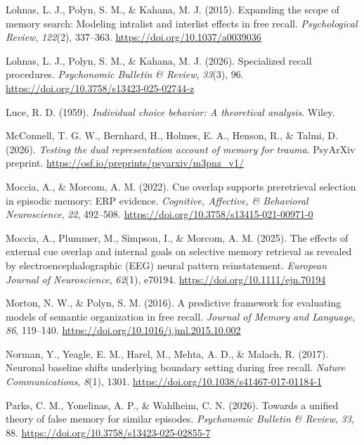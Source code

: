 \documentclass[
  man,
  floatsintext,
  longtable,
  nolmodern,
  notxfonts,
  notimes,
  draftfirst,
  colorlinks=true,linkcolor=blue,citecolor=blue,urlcolor=blue]{apa7}
\newlength{\cslhangindent}
\newenvironment{CSLReferences}[2] %
 {\begin{list}{}{%
  \setlength{\itemindent}{0pt}
  \setlength{\leftmargin}{0pt}
  \setlength{\parsep}{0pt}
  \ifodd #1
   \setlength{\leftmargin}{\cslhangindent}
   \setlength{\itemindent}{-1\cslhangindent}
  \fi
  \setlength{\itemsep}{#2\baselineskip}}}
 {\end{list}}
\begin{document}
\begin{CSLReferences}{1}{0}
Lohnas, L. J., Polyn, S. M., \& Kahana, M. J. (2015). Expanding the
scope of memory search: Modeling intralist and interlist effects in free
recall. \emph{Psychological Review}, \emph{122}(2), 337--363.
\url{https://doi.org/10.1037/a0039036}

Lohnas, L. J., Polyn, S. M., \& Kahana, M. J. (2026). Specialized recall
procedures. \emph{Psychonomic Bulletin \& Review}, \emph{33}(3), 96.
\url{https://doi.org/10.3758/s13423-025-02744-z}

Luce, R. D. (1959). \emph{Individual choice behavior: A theoretical
analysis}. Wiley.

McConnell, T. G. W., Bernhard, H., Holmes, E. A., Henson, R., \& Talmi,
D. (2026). \emph{Testing the dual representation account of memory for
trauma}. PsyArXiv preprint.
\url{https://osf.io/preprints/psyarxiv/m3pnz_v1/}

Moccia, A., \& Morcom, A. M. (2022). Cue overlap supports preretrieval
selection in episodic memory: {ERP} evidence. \emph{Cognitive,
Affective, \& Behavioral Neuroscience}, \emph{22}, 492--508.
\url{https://doi.org/10.3758/s13415-021-00971-0}

Moccia, A., Plummer, M., Simpson, I., \& Morcom, A. M. (2025). The
effects of external cue overlap and internal goals on selective memory
retrieval as revealed by electroencephalographic ({EEG}) neural pattern
reinstatement. \emph{European Journal of Neuroscience}, \emph{62}(1),
e70194. \url{https://doi.org/10.1111/ejn.70194}

Morton, N. W., \& Polyn, S. M. (2016). A predictive framework for
evaluating models of semantic organization in free recall. \emph{Journal
of Memory and Language}, \emph{86}, 119--140.
\url{https://doi.org/10.1016/j.jml.2015.10.002}

Norman, Y., Yeagle, E. M., Harel, M., Mehta, A. D., \& Malach, R.
(2017). Neuronal baseline shifts underlying boundary setting during free
recall. \emph{Nature Communications}, \emph{8}(1), 1301.
\url{https://doi.org/10.1038/s41467-017-01184-1}

Parks, C. M., Yonelinas, A. P., \& Wahlheim, C. N. (2026). Towards a
unified theory of false memory for similar episodes. \emph{Psychonomic
Bulletin \& Review}, \emph{33}, 88.
\url{https://doi.org/10.3758/s13423-025-02855-7}


\end{CSLReferences}
\end{document}
